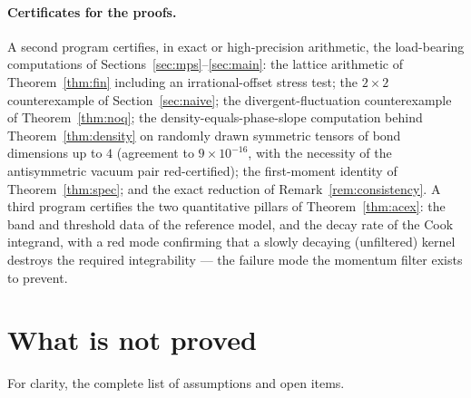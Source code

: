 \documentclass[11pt]{article}
\theoremstyle{definition}
\theoremstyle{remark}
\begin{document}
\paragraph{Certificates for the proofs.}
A second program certifies, in exact or high-precision arithmetic, the
load-bearing computations of Sections~\ref{sec:mps}--\ref{sec:main}: the
lattice arithmetic of Theorem~\ref{thm:fin} including an irrational-offset
stress test; the $2\times2$ counterexample of Section~\ref{sec:naive}; the
divergent-fluctuation counterexample of Theorem~\ref{thm:noq}; the
density-equals-phase-slope computation behind Theorem~\ref{thm:density} on
randomly drawn symmetric tensors of bond dimensions up to $4$ (agreement to
$9\times10^{-16}$, with the necessity of the antisymmetric vacuum pair
red-certified); the first-moment identity of Theorem~\ref{thm:spec}; and the
exact reduction of Remark~\ref{rem:consistency}.  A third program certifies
the two quantitative pillars of Theorem~\ref{thm:acex}: the band and
threshold data of the reference model, and the decay rate of the Cook
integrand, with a red mode confirming that a slowly decaying (unfiltered)
kernel destroys the required integrability --- the failure mode the
momentum filter exists to prevent.

\section{What is not proved}\label{sec:notproved}

For clarity, the complete list of assumptions and open items.
\end{document}
